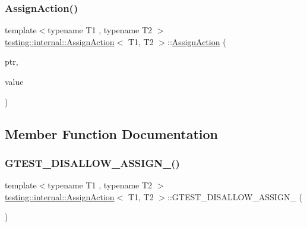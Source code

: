 \subsubsection{\texorpdfstring{AssignAction()}{AssignAction()}\hspace{0.1cm}{\footnotesize\ttfamily [3/3]}}
{\footnotesize\ttfamily template$<$typename T1 , typename T2 $>$ \\
\mbox{\hyperlink{classtesting_1_1internal_1_1_assign_action}{testing\+::internal\+::\+Assign\+Action}}$<$ T1, T2 $>$\+::\mbox{\hyperlink{classtesting_1_1internal_1_1_assign_action}{Assign\+Action}} (\begin{DoxyParamCaption}\item[{T1 $\ast$}]{ptr,  }\item[{T2}]{value }\end{DoxyParamCaption})\hspace{0.3cm}{\ttfamily [inline]}}



\subsection{Member Function Documentation}
\mbox{\label{classtesting_1_1internal_1_1_assign_action_af69bcf574c5453e4120fc770d604ddaa}} 
\subsubsection{\texorpdfstring{GTEST\_DISALLOW\_ASSIGN\_()}{GTEST\_DISALLOW\_ASSIGN\_()}\hspace{0.1cm}{\footnotesize\ttfamily [1/3]}}
{\footnotesize\ttfamily template$<$typename T1 , typename T2 $>$ \\
\mbox{\hyperlink{classtesting_1_1internal_1_1_assign_action}{testing\+::internal\+::\+Assign\+Action}}$<$ T1, T2 $>$\+::G\+T\+E\+S\+T\+\_\+\+D\+I\+S\+A\+L\+L\+O\+W\+\_\+\+A\+S\+S\+I\+G\+N\+\_\+ (\begin{DoxyParamCaption}\item[{\mbox{\hyperlink{classtesting_1_1internal_1_1_assign_action}{Assign\+Action}}$<$ T1, T2 $>$}]{ }\end{DoxyParamCaption})\hspace{0.3cm}{\ttfamily [private]}}

